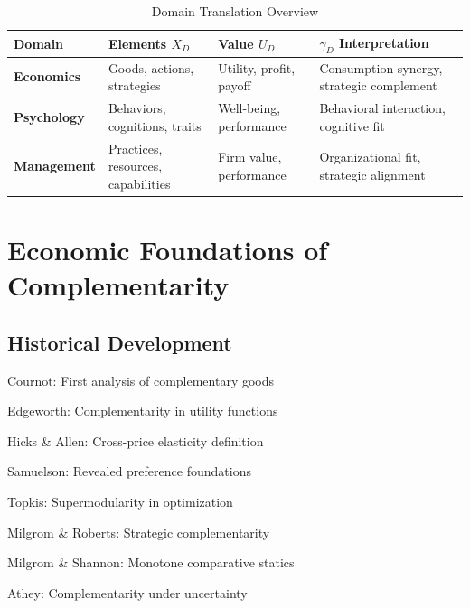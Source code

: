 \begin{table}[h]
\centering
\caption{Domain Translation Overview}
\label{tab:domain-overview}
\renewcommand{\arraystretch}{1.4}
\begin{tabular}{@{}p{2.5cm}p{3cm}p{3cm}p{4cm}@{}}
\toprule
\textbf{Domain} & \textbf{Elements $X_D$} & \textbf{Value $U_D$} & \textbf{$\gamma_D$ Interpretation} \\
\midrule
\textbf{Economics} & Goods, actions, strategies & Utility, profit, payoff & Consumption synergy, strategic complement \\
\textbf{Psychology} & Behaviors, cognitions, traits & Well-being, performance & Behavioral interaction, cognitive fit \\
\textbf{Management} & Practices, resources, capabilities & Firm value, performance & Organizational fit, strategic alignment \\
\bottomrule
\end{tabular}
\end{table}

\section{Economic Foundations of Complementarity}
\label{sec:economics}

\subsection{Historical Development}

\begin{tcolorbox}[colback=gray!5!white,colframe=gray!75!black,title=\textbf{Timeline: Complementarity in Economics}]
\begin{description}[noitemsep]
    \item[1838] Cournot: First analysis of complementary goods
    \item[1881] Edgeworth: Complementarity in utility functions
    \item[1934] Hicks \& Allen: Cross-price elasticity definition
    \item[1947] Samuelson: Revealed preference foundations
    \item[1978] Topkis: Supermodularity in optimization
    \item[1990] Milgrom \& Roberts: Strategic complementarity
    \item[1994] Milgrom \& Shannon: Monotone comparative statics
    \item[2007] Athey: Complementarity under uncertainty
\end{description}
\end{tcolorbox}

